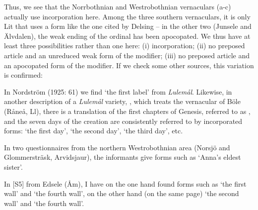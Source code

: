 {%
Thus, we see that the Norrbothnian and Westrobothnian vernaculars (a-c) actually use incorporation here. Among the three southern vernaculars, it is only Lit that uses a form like the one cited by Delsing – in the other two (Junsele and Älvdalen), the weak ending of the ordinal has been apocopated. We thus have at least three possibilities rather than one here: (i) incorporation; (ii) no preposed article and an unreduced weak form of the modifier; (iii) no preposed article and an apocopated form of the modifier. If we check some other sources, this variation is confirmed:


In Nordström (1925: 61) we find  ‘the first label’ from \textit{Lulemål}. Likewise, in another description of a \textit{Lulemål} variety, \citet{Wikberg2004}, which treats the vernacular of Böle (Råneå, Ll), there is a translation of the first chapters of Genesis, referred to as , and the seven days of the creation are consistently referred to by incorporated forms:  ‘the first day’,  ‘the second day’,  ‘the third day’, etc. 


In two questionnaires from the northern Westrobothnian area (Norsjö and Glommersträsk, Arvidsjaur), the informants give forms such as  ‘Anna’s eldest sister’.


In [S5] from Edsele (Åm), I have on the one hand found forms such as  ‘the first wall’ and ‘the fourth wall’, on the other hand (on the same page)  ‘the second wall’ and ‘the fourth wall’.


}
